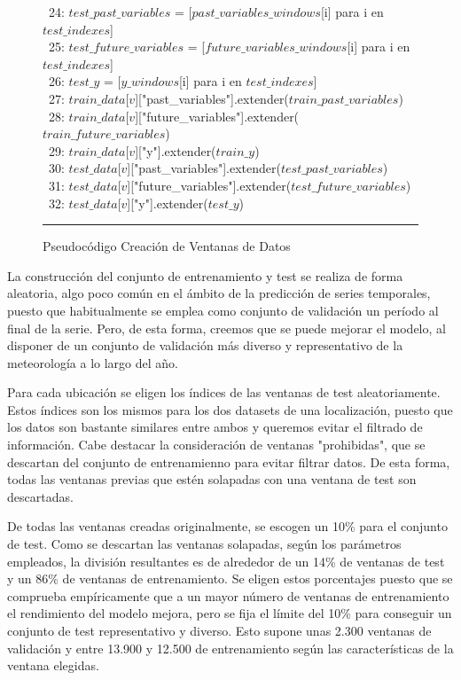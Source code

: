 \begin{figure}[H]
{\begin{center}
\begin{tabbing}
\ 24: \> \> \> $test\_past\_variables$ = [$past\_variables\_windows$[i] para i en $test\_indexes$] \\
\ 25: \> \> \> $test\_future\_variables$ = [$future\_variables\_windows$[i] para i en $test\_indexes$] \\
\ 26: \> \> \> $test\_y$ = [$y\_windows$[i] para i en $test\_indexes$] \\
      
\ 27: \> \> \> $train\_data$[$v$]["past\_variables"].extender($train\_past\_variables$) \\
\ 28: \> \> \> $train\_data$[$v$]["future\_variables"].extender($train\_future\_variables$) \\
\ 29: \> \> \> $train\_data$[$v$][\string"y"].extender($train\_y$) \\
        
\ 30: \> \> \> $test\_data$[$v$]["past\_variables"].extender($test\_past\_variables$) \\
\ 31: \> \> \> $test\_data$[$v$]["future\_variables"].extender($test\_future\_variables$) \\
\ 32: \> \> \> $test\_data$[$v$][\string"y"].extender($test\_y$) \\

\end{tabbing}
\end{center}
\hrule
}
\caption{Pseudocódigo Creación de Ventanas de Datos}
\label{branch_and_bound_max_diversity}
\end{figure}

La construcción del conjunto de entrenamiento y test se realiza de forma aleatoria, algo poco común en el ámbito de la predicción de series temporales, puesto que habitualmente 
se emplea como conjunto de validación un período al final de la serie. Pero, de esta forma, creemos que se puede mejorar el modelo, al disponer de un conjunto de validación
más diverso y representativo de la meteorología a lo largo del año.

Para cada ubicación se eligen los índices de las ventanas de test aleatoriamente. Estos índices son los mismos para los dos datasets de una localización, 
puesto que los datos son bastante similares entre ambos y queremos evitar el filtrado de información. 
Cabe destacar la consideración de ventanas "prohibidas", que se descartan del conjunto de entrenamienno para evitar filtrar datos.
De esta forma, todas las ventanas previas que estén solapadas con una ventana de test son descartadas.

De todas las ventanas creadas originalmente, se escogen un 10\% para el conjunto de test. Como se descartan las ventanas solapadas, según los parámetros empleados, la división resultantes
es de alrededor de un 14\% de ventanas de test y un 86\% de ventanas de entrenamiento. Se eligen estos porcentajes puesto que se comprueba empíricamente que a un mayor número de 
ventanas de entrenamiento el rendimiento del modelo mejora, pero se fija el límite del 10\% para conseguir un conjunto de test representativo y diverso. Esto supone unas 2.300 ventanas
de validación y entre 13.900 y 12.500 de entrenamiento según las características de la ventana elegidas. 

